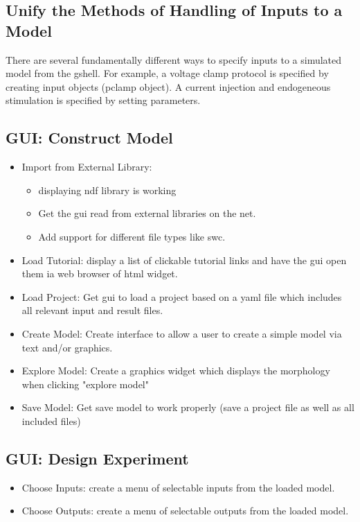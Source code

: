 \documentclass[12pt]{article}
\begin{document}
\subsection{Unify the Methods of Handling of Inputs to a Model}

There are several fundamentally different ways to specify inputs to a
simulated model from the gshell.  For example, a voltage clamp
protocol is specified by creating input objects (pclamp object).  A
current injection and endogeneous stimulation is specified by setting
parameters.

\subsection{GUI: Construct Model}

\begin{itemize}
\item Import from External Library:
  \begin{itemize}
  \item displaying ndf library is working
  \item Get the gui read from external libraries on the net.
  \item Add support for different file types like swc.
  \end{itemize}
\item Load Tutorial: display a list of clickable tutorial links and
  have the gui open them ia web browser of html widget.
\item Load Project: Get gui to load a project based on a yaml file
  which includes all relevant input and result files.
\item Create Model: Create interface to allow a user to create a
  simple model via text and/or graphics.
\item Explore Model: Create a graphics widget which displays the
  morphology when clicking "explore model"
\item Save Model: Get save model to work properly (save a project file
  as well as all included files)
\end{itemize}

\subsection{GUI: Design Experiment}
\begin{itemize}
\item Choose Inputs: create a menu of selectable inputs from the loaded model.
\item Choose Outputs: create a menu of selectable outputs from the loaded model.
\end{itemize}
\end{document}

